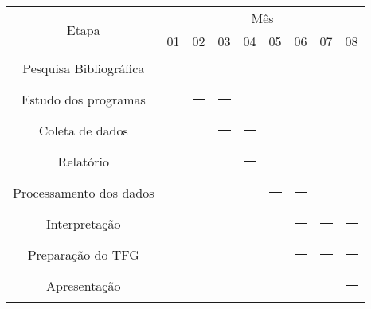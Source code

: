 


\newcommand{\marca}{\rule{0.8cm}{.2cm}}
\begin{center}
  \begin{tabular}{c|cccccccc}\hline
    \multirow{2}{*}{Etapa}	&\multicolumn{8}{c}{Mês}\\\cline{2-9}
    			  	&01&02&03&04&05&06&07&08\\\hline
Pesquisa Bibliográfica	&\marca &\marca &\marca &\marca &\marca &\marca &\marca &       \\ 	
Estudo dos programas	&       &\marca &\marca &       &       &       &       &       \\ 	
Coleta de dados		&       &       &\marca &\marca &       &       &       &       \\ 	
Relatório		&       &       &       &\marca &       &       &       &       \\ 	
Processamento dos dados	&       &       &       &       &\marca &\marca &       &       \\
Interpretação		&       &       &       &       &	&\marca &\marca &\marca \\
Preparação do TFG	&       &       &       &       &       &\marca &\marca &\marca \\
Apresentação		&       &       &       &       &       &       &       &\marca \\
    \hline
  \end{tabular}
\end{center}



